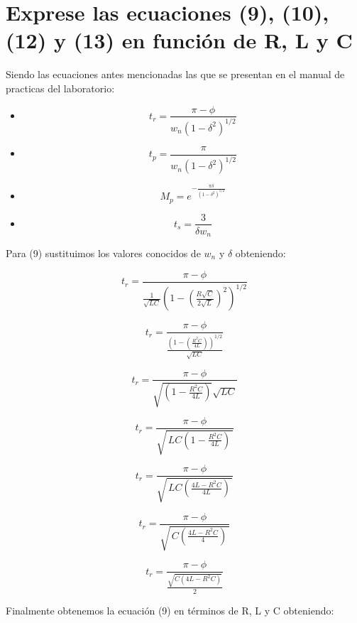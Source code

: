 \documentclass[12pt, letterpaper]{article}
\begin{document}
\section{Exprese las ecuaciones (9), (10), (12) y (13) en función de R, L y C}

Siendo las ecuaciones antes mencionadas las que se presentan en el manual de practicas del laboratorio:

\begin{itemize}
    \item 
        \begin{equation}
            t_r= \frac{\pi - \phi}{w_n (1-\delta^2)^{1/2}}
            \tag{9}
        \end{equation}
    \item 
        \begin{equation}
            t_p = \frac{\pi}{w_n (1-\delta^2)^{1/2}}
            \tag{10}
        \end{equation}
    \item 
        \begin{equation}
            M_p = e^{- \frac{\pi \delta}{(1-\delta^2)^{1/2}}}
            \tag{12}
        \end{equation}
    \item 
        \begin{equation}
            t_s = \frac{3}{\delta w_n}
            \tag{13}
        \end{equation}
\end{itemize}

Para (9) sustituimos los valores conocidos de \(w_n\) y \(\delta\) obteniendo:

\[t_r= \frac{\pi - \phi}{\frac{1}{\sqrt{LC}} (1-(\frac{R\sqrt{C}}{2\sqrt{L}})^2)^{1/2}}\]

\[t_r= \frac{\pi - \phi}{\frac{(1-(\frac{R^2C}{4L}))^{1/2}}{\sqrt{LC}}}\]

\[t_r= \frac{\pi - \phi}{\sqrt{(1-\frac{R^2C}{4L})}{\sqrt{LC}}}\]

\[t_r = \frac{\pi-\phi}{\sqrt{\,LC\!\left(1-\frac{R^2 C}{4L}\right)\,}}\]

\[t_r = \frac{\pi-\phi}{\sqrt{\,LC\!\left(\frac{4L - R^2C}{4L}\right)\,}}\]

\[t_r = \frac{\pi-\phi}{\sqrt{\,C\!\left(\frac{4L - R^2C}{4}\right)\,}}\]

\[t_r = \frac{\pi-\phi}{\frac{\sqrt{C(4L-R^2C)}}{2}}\]

Finalmente obtenemos la ecuación (9) en términos de R, L y C obteniendo:
\end{document}
